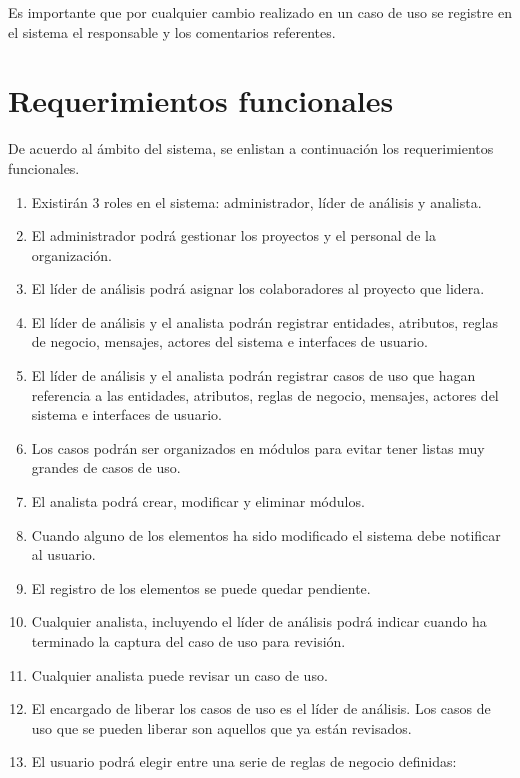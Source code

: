 Es importante que por cualquier cambio realizado en un caso de uso se registre en el sistema el responsable y los comentarios referentes.\\

\section{Requerimientos funcionales}
De acuerdo al ámbito del sistema, se enlistan a continuación los requerimientos funcionales.
\begin{enumerate}[{\bf RF1.}]
 \item Existirán 3 roles en el sistema: administrador, líder de análisis y analista.
 \item El administrador podrá gestionar los proyectos y el personal de la organización.
 \item El líder de análisis podrá asignar los colaboradores al proyecto que lidera.
 \item El líder de análisis y el analista podrán registrar entidades, atributos, reglas de negocio, mensajes, actores del sistema e interfaces de usuario.
 \item El líder de análisis y el analista podrán registrar casos de uso que hagan referencia a las entidades, atributos, reglas de negocio, mensajes, actores del sistema e interfaces de usuario.
 \item Los casos podrán ser organizados en módulos para evitar tener listas muy grandes de casos de uso.
 \item El analista podrá crear, modificar y eliminar módulos.
 \item Cuando alguno de los elementos ha sido modificado el sistema debe notificar al usuario.
 \item El registro de los elementos se puede quedar pendiente.
 \item Cualquier analista, incluyendo el líder de análisis podrá indicar cuando ha terminado la captura del caso de uso para revisión.
 \item Cualquier analista puede revisar un caso de uso.
 \item El encargado de liberar los casos de uso es el líder de análisis. Los casos de uso que se pueden liberar son aquellos que ya están revisados.
 \item El usuario podrá elegir entre una serie de reglas de negocio definidas:
	\begin{itemize}

\end{itemize}
\end{enumerate}
